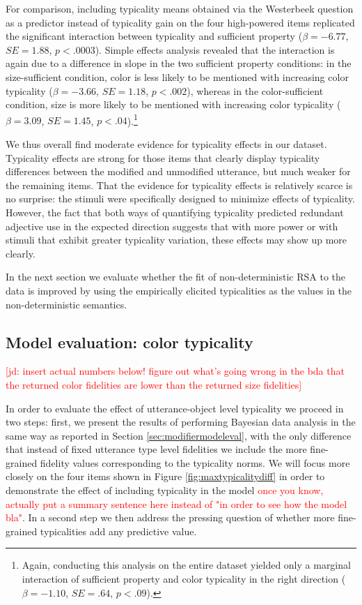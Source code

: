 \documentclass[11pt]{article}
\newcommand{\red}[1]{\textcolor{Red}{#1}}
\newcommand{\jd}[1]{\textcolor{Red}{[jd: #1]}}
\newcommand{\figref}[1]{Figure \ref{#1}}
\newcommand{\sectionref}[1]{Section \ref{#1}}
\begin{document}
For comparison, including typicality means obtained via the Westerbeek question as a predictor instead of typicality gain on the four high-powered items replicated the significant interaction between typicality and sufficient property ($\beta = -6.77$, $SE = 1.88$, $p < .0003$). Simple effects analysis revealed that the interaction is again due to a difference in slope in the two sufficient property conditions: in the size-sufficient condition, color is less likely to be mentioned with increasing color typicality   ($\beta = -3.66$, $SE = 1.18$, $p < .002$), whereas in the color-sufficient condition, size is more likely to be mentioned with increasing color typicality ($\beta = 3.09$, $SE = 1.45$, $p < .04$).\footnote{Again, conducting this analysis on the entire dataset yielded only a marginal interaction of sufficient property and color typicality in the right direction ($\beta = -1.10$, $SE = .64$, $p < .09$).}

We thus overall find moderate evidence for typicality effects in our dataset. Typicality effects are strong for those items that clearly display typicality differences between the modified and unmodified utterance, but much weaker for the remaining items. That the evidence for typicality effects is relatively scarce is no surprise: the stimuli were specifically designed to minimize effects of typicality. However, the fact that both ways of quantifying typicality predicted redundant adjective use in the expected direction suggests that with more power or with stimuli that exhibit greater typicality variation, these effects may show up more clearly.

In the next section we evaluate whether the fit of non-deterministic RSA to the data is improved by using the empirically elicited typicalities as the values in the non-deterministic semantics.

\subsection{Model evaluation: color typicality}
\label{sec:modelevalcolortypicality}

\jd{insert actual numbers below! figure out what's going wrong in the bda that the returned color fidelities are lower than the returned size fidelities}

In order to evaluate the effect of utterance-object level typicality we proceed in two steps: first, we present the results of performing Bayesian data analysis in the same way as reported in \sectionref{sec:modifiermodeleval}, with the only difference that instead of fixed utterance type level fidelities we include the more fine-grained fidelity values corresponding to the typicality norms. We will focus more closely on the four items shown in \figref{fig:maxtypicalitydiff} in order to demonstrate the effect of including typicality in the model \red{once you know, actually put a summary sentence here instead of "in order to see how the model bla"}. In a second step we then address the pressing question of whether more fine-grained typicalities add any predictive value. 
\end{document}
